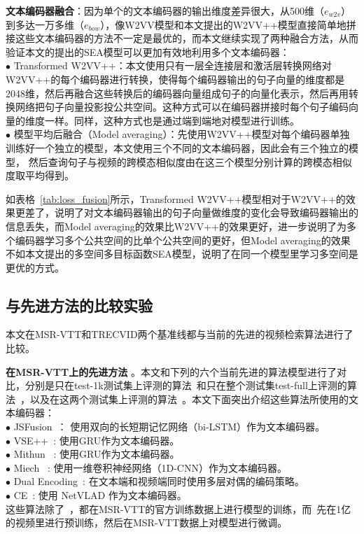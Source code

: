 

\textbf{文本编码器融合}：因为单个的文本编码器的输出维度差异很大，从500维（$e_{w2v}$）到多达一万多维（$e_{bow}$），像W2VV模型和本文提出的W2VV++模型直接简单地拼接这些文本编码器的方法不一定是最优的，而本文继续实现了两种融合方法，从而验证本文的提出的SEA模型可以更加有效地利用多个文本编码器：\\
$\bullet$ Transformed W2VV++：本文使用只有一层全连接层和激活层转换网络对W2VV++的每个编码器进行转换，使得每个编码器输出的句子向量的维度都是2048维，然后再融合这些转换后的编码器向量组成句子的向量化表示，然后再用转换网络把句子向量投影投公共空间。这种方式可以在编码器拼接时每个句子编码向量的维度一样。同样，这种方式也是通过端到端地对模型进行训练。  \\
$\bullet$ 模型平均后融合（Model averaging）：先使用W2VV++模型对每个编码器单独训练好一个独立的模型，本文使用三个不同的文本编码器，因此会有三个独立的模型， 然后查询句子与视频的跨模态相似度由在这三个模型分别计算的跨模态相似度取平均得到。

如表格~\ref{tab:loss_fusion}所示，Transformed W2VV++模型相对于W2VV++的效果更差了，说明了对文本编码器输出的句子向量做维度的变化会导致编码器输出的信息丢失，而Model averaging的效果比W2VV++的效果更好，进一步说明了为多个编码器学习多个公共空间的比单个公共空间的更好，但Model averaging的效果不如本文提出的多空间多目标函数SEA模型，说明了在同一个模型里学习多空间是更优的方式。


\subsection{与先进方法的比较实验}
本文在MSR-VTT和TRECVID两个基准线都与当前的先进的视频检索算法进行了比较。

\textbf{在MSR-VTT上的先进方法} 。本文和下列的六个当前先进的算法模型进行了对比，分别是只在test-1k测试集上评测的算法~\cite{miech2019howto100m,yu2018a}和只在整个测试集test-full上评测的算法~\cite{mithun2018learning}，以及在这两个测试集上评测的算法~\cite{dong2019dual,faghri2017vse++,liu2019use}。本文下面突出介绍这些算法所使用的文本编码器：\\
$\bullet$ JSFusion~\cite{yu2018a}： 使用双向的长短期记忆网络（bi-LSTM）作为文本编码器。 \\
$\bullet$ VSE++~\cite{faghri2017vse++}: 使用GRU作为文本编码器。 \\
$\bullet$ Mithun \etal~\cite{mithun2018learning}: 使用GRU作为文本编码器。 \\
$\bullet$ Miech \etal~\cite{miech2019howto100m}: 使用一维卷积神经网络（1D-CNN）作为文本编码器。 \\
$\bullet$ Dual Encoding~\cite{dong2019dual}: 在文本端和视频端同时使用多层对偶的编码策略。\\
$\bullet$ CE~\cite{liu2019use}: 使用 NetVLAD 作为文本编码器。\\
这些算法除了~\cite{miech2019howto100m}，都在MSR-VTT的官方训练数据上进行模型的训练，而~\cite{miech2019howto100m}先在1亿的视频里进行预训练，然后在MSR-VTT数据上对模型进行微调。

